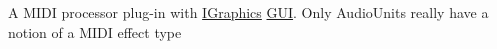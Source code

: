A M\+I\+DI processor plug-\/in with \mbox{\hyperlink{class_i_graphics}{I\+Graphics}} \mbox{\hyperlink{class_g_u_i}{G\+UI}}. Only Audio\+Units really have a notion of a M\+I\+DI effect type 